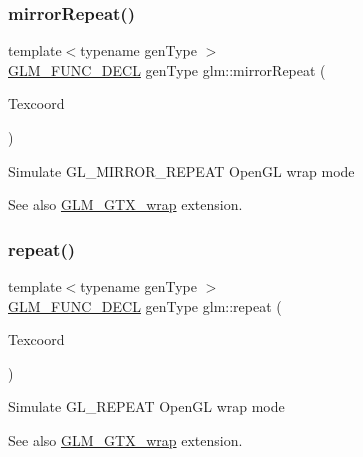 \subsubsection{\texorpdfstring{mirror\+Repeat()}{mirrorRepeat()}}
{\footnotesize\ttfamily template$<$typename gen\+Type $>$ \\
\mbox{\hyperlink{setup_8hpp_ab2d052de21a70539923e9bcbf6e83a51}{G\+L\+M\+\_\+\+F\+U\+N\+C\+\_\+\+D\+E\+CL}} gen\+Type glm\+::mirror\+Repeat (\begin{DoxyParamCaption}\item[{gen\+Type const \&}]{Texcoord }\end{DoxyParamCaption})}

Simulate G\+L\+\_\+\+M\+I\+R\+R\+O\+R\+\_\+\+R\+E\+P\+E\+AT Open\+GL wrap mode \begin{DoxySeeAlso}{See also}
\mbox{\hyperlink{group__gtx__wrap}{G\+L\+M\+\_\+\+G\+T\+X\+\_\+wrap}} extension. 
\end{DoxySeeAlso}
\mbox{\label{group__gtx__wrap_ga809650c6310ea7c42666e918c117fb6f}} 
\subsubsection{\texorpdfstring{repeat()}{repeat()}}
{\footnotesize\ttfamily template$<$typename gen\+Type $>$ \\
\mbox{\hyperlink{setup_8hpp_ab2d052de21a70539923e9bcbf6e83a51}{G\+L\+M\+\_\+\+F\+U\+N\+C\+\_\+\+D\+E\+CL}} gen\+Type glm\+::repeat (\begin{DoxyParamCaption}\item[{gen\+Type const \&}]{Texcoord }\end{DoxyParamCaption})}

Simulate G\+L\+\_\+\+R\+E\+P\+E\+AT Open\+GL wrap mode \begin{DoxySeeAlso}{See also}
\mbox{\hyperlink{group__gtx__wrap}{G\+L\+M\+\_\+\+G\+T\+X\+\_\+wrap}} extension. 
\end{DoxySeeAlso}
